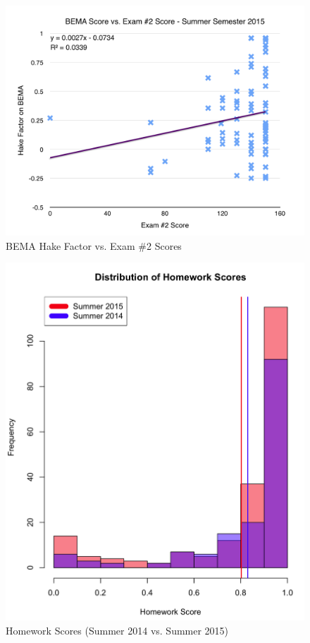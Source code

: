 \pagebreak\clearpage

\begin{figure}
	\centering
	\includegraphics[width=5in]{img/chapter4/bema_vs_ex2_su15}
	\caption[BEMA Hake Factor vs. Exam \#2 Scores]{BEMA Hake Factor vs. Exam \#2 Scores}
  \label{fig:bemaVsExTwoSu15}
\end{figure}

\pagebreak\clearpage

\begin{figure}
	\centering
	\includegraphics[width=5in]{img/chapter4/hw_su15_vs_su14}
	\caption[Homework Scores (Summer 2014 vs. Summer 2015)]{Homework Scores (Summer 2014 vs. Summer 2015)}
  \label{fig:hwSu14Su15}
\end{figure}

